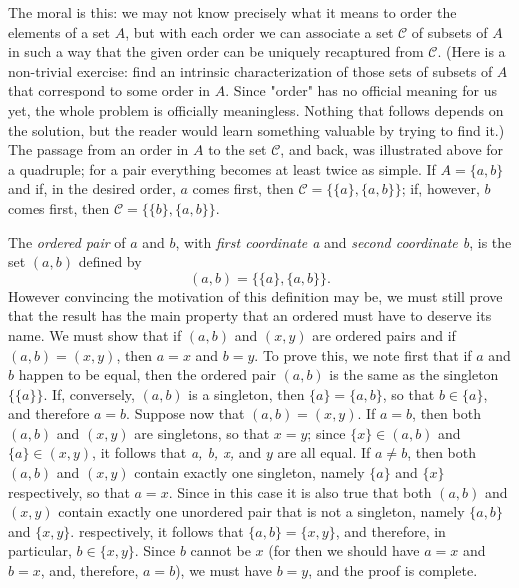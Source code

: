The moral is this: we may not know precisely what it means to order the elements of a set $A$, but with each order we can associate a set $ \mathcal{C} $ of subsets of $A$ in such a way that the given order can be uniquely recaptured from $ \mathcal{C} $. (Here is a non-trivial exercise: find an intrinsic characterization of those sets of subsets of $A$ that correspond to some order in $A$. Since "order" has no official meaning for us yet, the whole problem is officially meaningless. Nothing that follows depends on the solution, but the reader would learn something valuable by trying to find it.) The passage from an order in $A$ to the set $ \mathcal{C} $, and back, was illustrated above for a quadruple; for a pair everything becomes at least twice as simple. If $ A = \{ a,b \}$ and if, in the desired order, $a$ comes first, then $ \mathcal{C} = \{ \{ a \} , \{ a,b \} \}$; if, however, $b$ comes first, then $ \mathcal{C} = \{ \{ b \}, \{a, b \}\}$. 

The \textit{ordered pair} of $a$ and $b$, with \textit{first coordinate a} and \textit{second coordinate b}, is the set $(a, b)$ defined by 
\begin{equation*}
(a, b) = \{ \{a \} , \{ a, b \} \}.
\end{equation*}
However convincing the motivation of this definition may be, we must still prove that the result has the main property that an ordered must have to deserve its name. We must show that if $(a,b)$ and $(x, y)$ are ordered pairs and if $(a,b) = (x,y)$, then $ a = x $ and $b = y$. To prove this, we note first that if $a$ and $b$ happen to be equal, then the ordered pair $(a,b)$ is the same as the singleton $ \{ \{ a \} \} $. If, conversely, $(a,b)$ is a singleton, then $ \{ a \} =  \{ a , b \}$, so that $ b \in \{ a \} $, and therefore $a = b$. Suppose now that $ (a, b) = (x, y)$. If $ a = b $, then both $(a, b)$ and $(x,y)$ are singletons, so that $ x = y $; since $ \{ x \} \in (a,b)$ and $ \{ a \} \in (x,y)$, it follows that \textit{a, b, x,} and $y$ are all equal. If $a \neq b$, then both $(a, b)$ and $(x, y)$ contain exactly one singleton, namely $ \{a \}$ and $ \{ x \} $ respectively, so that $a = x$. Since in this case it is also true that both $(a,b)$ and $(x, y)$ contain exactly one unordered pair that is not a singleton, namely $ \{a, b \}$ and $ \{ x, y \}$. respectively, it follows that $ \{ a, b \} = \{ x,y \} $, and therefore, in particular, $b \in \{ x,y \} $. Since $b$ cannot be $x$ (for then we should have $ a = x $ and $ b = x $, and, therefore, $ a = b $), we must have $b = y $, and the proof is complete. 

